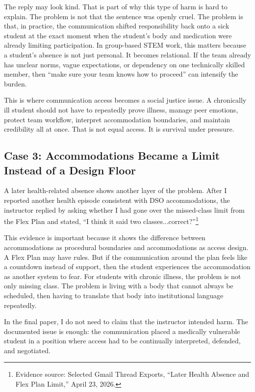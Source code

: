 \documentclass[12pt]{article}
\begin{document}
The reply may look kind. That is part of why this type of harm is hard to explain. The problem is not that the sentence was openly cruel. The problem is that, in practice, the communication shifted responsibility back onto a sick student at the exact moment when the student's body and medication were already limiting participation. In group-based STEM work, this matters because a student's absence is not just personal. It becomes relational. If the team already has unclear norms, vague expectations, or dependency on one technically skilled member, then ``make sure your team knows how to proceed'' can intensify the burden.

This is where communication access becomes a social justice issue. A chronically ill student should not have to repeatedly prove illness, manage peer emotions, protect team workflow, interpret accommodation boundaries, and maintain credibility all at once. That is not equal access. It is survival under pressure.

\subsection*{Case 3: Accommodations Became a Limit Instead of a Design Floor}

A later health-related absence shows another layer of the problem. After I reported another health episode consistent with DSO accommodations, the instructor replied by asking whether I had gone over the missed-class limit from the Flex Plan and stated, ``I think it said two classes...correct?''\footnote{Evidence source: Selected Gmail Thread Exports, ``Later Health Absence and Flex Plan Limit,'' April 23, 2026.}

This evidence is important because it shows the difference between accommodations as procedural boundaries and accommodations as access design. A Flex Plan may have rules. But if the communication around the plan feels like a countdown instead of support, then the student experiences the accommodation as another system to fear. For students with chronic illness, the problem is not only missing class. The problem is living with a body that cannot always be scheduled, then having to translate that body into institutional language repeatedly.

In the final paper, I do not need to claim that the instructor intended harm. The documented issue is enough: the communication placed a medically vulnerable student in a position where access had to be continually interpreted, defended, and negotiated.
\end{document}
